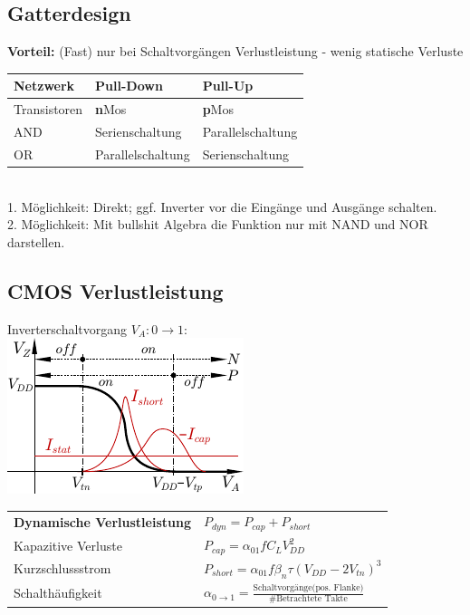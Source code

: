 \documentclass[6pt,a4paper]{scrartcl}
\renewcommand{\emph}[1]{\textsf{\textbf{#1}}}
\newcommand{\ra}[0]{\ensuremath{\rightarrow}} 									%
\begin{document}
\begin{multicols}{3}
	\subsection{Gatterdesign}
	\emph{Vorteil:}	 (Fast) nur bei Schaltvorgängen Verlustleistung - wenig statische Verluste
	\begin{tabular}{l|l|l}
		Netzwerk & Pull-Dow\bf{n} & Pull-U\bf{p} \\ \midrule
		Transistoren & \textbf{n}Mos & \textbf{p}Mos \\
		AND & Serienschaltung	 & Parallelschaltung \\
		OR & Parallelschaltung & Serienschaltung \\
	\end{tabular}\\
	1. Möglichkeit: Direkt; ggf. Inverter vor die Eingänge und Ausgänge schalten.\\
	2. Möglichkeit: Mit bullshit Algebra die Funktion nur mit NAND und NOR darstellen.\\

	\subsection{CMOS Verlustleistung}
	Inverterschaltvorgang $V_A: 0 \ra 1$:\\
	\includegraphics{./img/ds/char_inverter.pdf}
	
	\begin{tabular}{ll}
		\emph{Dynamische Verlustleistung}	& $P_{dyn} = P_{cap} + P_{short}$\\
		\quad Kapazitive Verluste & $P_{cap} = \alpha_{01} f C_L V_{DD}^2$\\
		\quad Kurzschlussstrom	& $P_{short} = \alpha_{01} f \beta_n \tau (V_{DD} - 2V_{tn})^3$\\[0.8em]
		\quad Schalthäufigkeit & $\alpha_{0 \rightarrow 1} = \frac{\text{Schaltvorgänge(pos. Flanke)}}{\text{\# Betrachtete Takte}}$\\
	\end{tabular}\\
	

\end{multicols}
\end{document}
